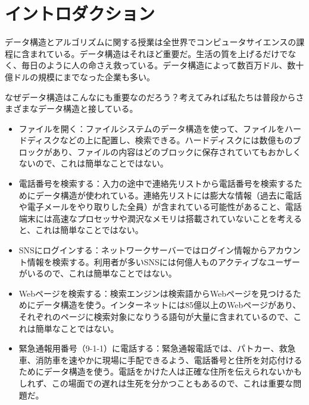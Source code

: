 \chapter{イントロダクション}

データ構造とアルゴリズムに関する授業は全世界でコンピュータサイエンスの課程に含まれている。データ構造はそれほど重要だ。生活の質を上げるだけでなく、毎日のように人の命さえ救っている。データ構造によって数百万ドル、数十億ドルの規模にまでなった企業も多い。

なぜデータ構造はこんなにも重要なのだろう？考えてみれば私たちは普段からさまざまなデータ構造と接している。

\begin{itemize}
	\item ファイルを開く：ファイルシステムのデータ構造を使って、ファイルをハードディスクなどの上に配置し、検索できる。ハードディスクには数億ものブロックがあり、ファイルの内容はどのブロックに保存されていてもおかしくないので、これは簡単なことではない。
	\item 電話番号を検索する：入力の途中で連絡先リストから電話番号を検索するためにデータ構造が使われている。連絡先リストには膨大な情報（過去に電話や電子メールをやり取りした全員）が含まれている可能性があること、電話端末には高速なプロセッサや潤沢なメモリは搭載されていないことを考えると、これは簡単なことではない。
	\item SNSにログインする：ネットワークサーバーではログイン情報からアカウント情報を検索する。利用者が多いSNSには何億人ものアクティブなユーザーがいるので、これは簡単なことではない。
	\item Webページを検索する：検索エンジンは検索語からWebページを見つけるためにデータ構造を使う。インターネットには85億以上のWebページがあり、それぞれのページに検索対象になりうる語句が大量に含まれているので、これは簡単なことではない。
	\item 緊急通報用番号（9-1-1）に電話する：緊急通報電話では、パトカー、救急車、消防車を速やかに現場に手配できるよう、電話番号と住所を対応付けるためにデータ構造を使う。電話をかけた人は正確な住所を伝えられないかもしれず、この場面での遅れは生死を分かつこともあるので、これは重要な問題だ。
\end{itemize}

